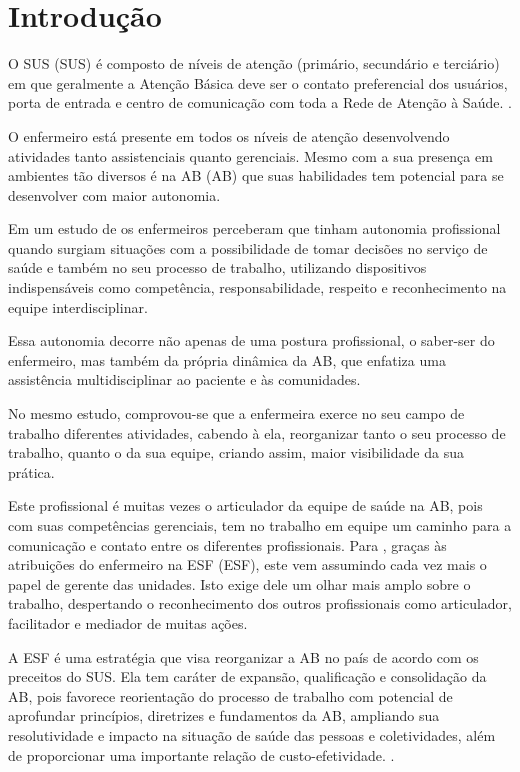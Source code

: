 \chapter{Introdução}
\label{cap:introducao}

O \acrlong{SUS} (\acrshort{SUS}) é composto de níveis de atenção (primário, secundário e terciário) em que geralmente a Atenção Básica deve ser o contato preferencial dos usuários, porta de entrada e centro de comunicação com toda a Rede de Atenção à Saúde. \cite{ministerio2012politica}.

O enfermeiro está presente em todos os  níveis de atenção desenvolvendo atividades tanto assistenciais quanto gerenciais. Mesmo com a sua presença em ambientes tão diversos é na \acrlong{AB} (\acrshort{AB}) que suas habilidades tem potencial para se desenvolver com maior autonomia. 

Em um estudo de \cite{kalinowski2013autonomia} os enfermeiros perceberam que tinham autonomia profissional quando surgiam situações com a possibilidade de tomar decisões no serviço de saúde e também no seu processo de trabalho, utilizando dispositivos indispensáveis como competência, responsabilidade, respeito e reconhecimento na equipe interdisciplinar.

Essa autonomia decorre não apenas de uma postura profissional, o saber-ser do enfermeiro, mas também da própria dinâmica da \acrshort{AB}, que enfatiza uma assistência multidisciplinar ao paciente e às comunidades. 

No mesmo estudo, comprovou-se que a enfermeira exerce no seu campo de trabalho diferentes atividades, cabendo à ela, reorganizar tanto o seu processo de trabalho, quanto  o da sua equipe, criando assim, maior visibilidade da sua prática. 

Este profissional é muitas vezes o articulador da equipe de saúde na AB, pois com suas competências gerenciais, tem no trabalho em equipe um caminho para a comunicação e contato entre os diferentes profissionais. Para \cite{rocha2013avaliaccao}, graças às atribuições do enfermeiro na \acrlong{ESF} (\acrshort{ESF}), este vem assumindo cada vez mais o papel de gerente das unidades. Isto exige dele um olhar mais amplo sobre o trabalho, despertando o reconhecimento dos outros profissionais como articulador, facilitador e mediador de muitas ações. 

A \acrshort{ESF} é uma estratégia que visa reorganizar a \acrshort{AB} no país de acordo com os preceitos do \acrshort{SUS}. Ela tem caráter de expansão, qualificação e consolidação da \acrshort{AB}, pois favorece reorientação do processo de trabalho com potencial de aprofundar princípios, diretrizes e fundamentos da \acrshort{AB}, ampliando sua resolutividade e impacto na situação de saúde das pessoas e coletividades, além de proporcionar uma importante relação de custo-efetividade. \cite{ministerio2012politica}.

